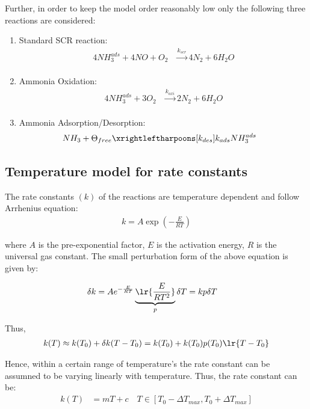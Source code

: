 Further, in order to keep the model order reasonably low only the following
three reactions are considered:
\begin{enumerate}
    \item Standard SCR reaction:
    \begin{align}
        4 NH_3 ^{ads} + 4 NO + O_2 &\xrightarrow[]{k_{scr}} 4 N_2 + 6 H_2O \label{eqn::std_scr}
    \end{align}
    \item Ammonia Oxidation:
    \begin{align}
        4 NH_3^{ads} + 3 O_2 &\xrightarrow[]{k_{oxi}} 2 N_2 + 6 H_2O \label{eqn::amox}
    \end{align}
    \item Ammonia Adsorption/Desorption:
        \begin{align}
            NH_3 + \Theta_{free} &\xrightleftharpoons[k_{des}]{k_{ads}} NH_3^{ads}
            \label{eqn::ads}
        \end{align}
\end{enumerate}


\subsection{Temperature model for rate constants}
The rate constants $(k)$ of the reactions are temperature dependent and follow
Arrhenius equation:
\begin{align*}
    k = A \exp\left(-\frac{E}{RT}\right)
\end{align*}

where $A$ is the pre-exponential factor, $E$ is the activation energy, $R$ is
the universal gas constant. The small perturbation form of the above equation is
given by:

\begin{align*}
    \delta k &= A e^{-\frac{E}{RT}} \underbrace{\lr{\frac{E}{RT^2}}}_p \delta T = k p \delta T
\end{align*}

Thus,
\begin{align*}
    k(T) \approx k(T_0) + \delta k(T - T_0) = k(T_0) + k(T_0) p(T_0) \lr{T - T_0}
\end{align*}

Hence, within a certain range of temperature's the rate constant can be assumned
to be varying linearly with temperature. Thus, the rate constant can be:
\begin{align*}
    k(T) &= mT + c \quad T \in [T_0 - \Delta T_{max}, T_0 + \Delta T_{max}]
\end{align*}

